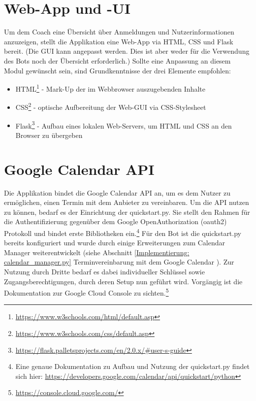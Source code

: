     \section{Web-App und -UI}
        Um dem Coach eine Übersicht über Anmeldungen und Nutzerinformationen anzuzeigen, stellt die Applikation eine Web-App via HTML, CSS und Flask bereit. (Die GUI kann angepasst werden. Dies ist aber weder für die Verwendung des Bots noch der Übersicht erforderlich.) Sollte eine Anpassung an diesem Modul gewünscht sein, sind Grundkenntnisse der drei Elemente empfohlen: 
        \begin{itemize}
            \item HTML\footnote{\url{https://www.w3schools.com/html/default.asp}} - Mark-Up der im Webbrowser auszugebenden Inhalte
            \item CSS\footnote{\url{https://www.w3schools.com/css/default.asp}} - optische Aufbereitung der Web-GUI via CSS-Stylesheet
            \item Flask\footnote{\url{https://flask.palletsprojects.com/en/2.0.x/\#user-s-guide}} - Aufbau eines lokalen Web-Servers, um HTML und CSS an den Browser zu übergeben
        \end{itemize}

        
    \section{Google Calendar API} \label{Grundlagen: Google Calendar API}
        Die Applikation bindet die Google Calendar API \cite{googleCalAPI} an, um es dem Nutzer zu ermöglichen, einen Termin mit dem Anbieter zu vereinbaren.
        Um die API nutzen zu können, bedarf es der Einrichtung der quickstart.py. Sie stellt den Rahmen für die Authentifizierung gegenüber dem Google Open\-Authorization (oauth2) Protokoll und bindet erste Bibliotheken ein.\footnote{Eine genaue Dokumentation zu Aufbau und Nutzung der quickstart.py findet sich hier: \url{https://developers.google.com/calendar/api/quickstart/python}}
        Für den Bot ist die quickstart.py bereits konfiguriert und wurde durch einige Erweiterungen zum Calendar Manager weiterentwickelt (siehe Abschnitt \ref{Implementierung: calendar_manager.py} Terminvereinbarung mit dem Google Calendar
        ). Zur Nutzung durch Dritte bedarf es dabei individueller Schlüssel sowie Zugangsberechtigungen, durch deren Setup nun geführt wird. Vorgängig ist die Dokumentation zur Google Cloud Console zu sichten.\footnote{\url{https://console.cloud.google.com/}}
        
